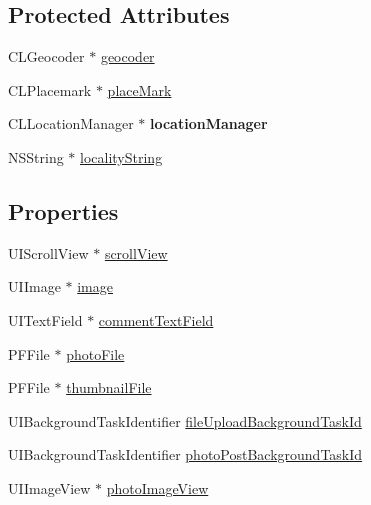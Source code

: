 \subsection*{Protected Attributes}
\begin{DoxyCompactItemize}
\item 
C\+L\+Geocoder $\ast$ \hyperlink{interface_e_s_edit_photo_view_controller_a9c0256bc0c68e185da4746f1fc966363}{geocoder}
\item 
C\+L\+Placemark $\ast$ \hyperlink{interface_e_s_edit_photo_view_controller_ace5372d346d0c41016fa45573d6088f9}{place\+Mark}
\item 
\hypertarget{interface_e_s_edit_photo_view_controller_a4785272276b39613ece6ed412d42eb49}{}C\+L\+Location\+Manager $\ast$ {\bfseries location\+Manager}\label{interface_e_s_edit_photo_view_controller_a4785272276b39613ece6ed412d42eb49}

\item 
N\+S\+String $\ast$ \hyperlink{interface_e_s_edit_photo_view_controller_af0590524a962c7e5e2f3608accbdf1c1}{locality\+String}
\end{DoxyCompactItemize}
\subsection*{Properties}
\begin{DoxyCompactItemize}
\item 
U\+I\+Scroll\+View $\ast$ \hyperlink{interface_e_s_edit_photo_view_controller_a3fa968f122fdee7d8c5f6c27a7365ec1}{scroll\+View}
\item 
U\+I\+Image $\ast$ \hyperlink{interface_e_s_edit_photo_view_controller_a0797810330842aa461d6985ea0ade2c5}{image}
\item 
U\+I\+Text\+Field $\ast$ \hyperlink{interface_e_s_edit_photo_view_controller_ac96f0e939d3d229c2493bf346f55a40b}{comment\+Text\+Field}
\item 
P\+F\+File $\ast$ \hyperlink{interface_e_s_edit_photo_view_controller_a98ac5e7f32b5d0b05de0d13af9afba07}{photo\+File}
\item 
P\+F\+File $\ast$ \hyperlink{interface_e_s_edit_photo_view_controller_a4fbd79755e22d14ea6d3e3ae87866792}{thumbnail\+File}
\item 
U\+I\+Background\+Task\+Identifier \hyperlink{interface_e_s_edit_photo_view_controller_ae5a6bcf0bf121023ec8d9b6dd942dfaa}{file\+Upload\+Background\+Task\+Id}
\item 
U\+I\+Background\+Task\+Identifier \hyperlink{interface_e_s_edit_photo_view_controller_ab9f5d2eb67909a03532d026fce42afcb}{photo\+Post\+Background\+Task\+Id}
\item 
U\+I\+Image\+View $\ast$ \hyperlink{interface_e_s_edit_photo_view_controller_ab2b5f951e3ee1d614418e91faba123b1}{photo\+Image\+View}
\end{DoxyCompactItemize}


